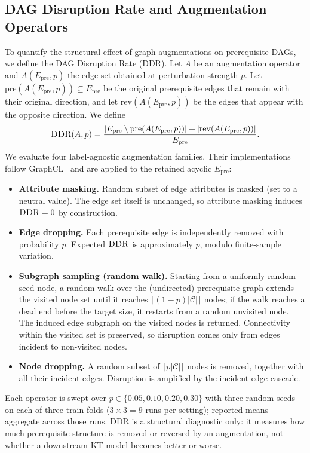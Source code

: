 \documentclass[runningheads]{llncs}
\newcommand{\Epre}{\ensuremath{E_{\text{pre}}}}
\newcommand{\DDR}{\textsc{DDR}}
\begin{document}
\subsection{DAG Disruption Rate and Augmentation Operators}
\label{sec:ddr}
To quantify the structural effect of graph augmentations on prerequisite
DAGs, we define the DAG Disruption Rate (\DDR{}). Let $A$ be an
augmentation operator and $A(\Epre,p)$ the edge set obtained at
perturbation strength $p$. Let $\mathrm{pre}(A(\Epre,p))\subseteq\Epre$
be the original prerequisite edges that remain with their original
direction, and let $\mathrm{rev}(A(\Epre,p))$ be the edges that appear
with the opposite direction. We define
\begin{equation}
\DDR(A,p)=
\frac{|\Epre\setminus \mathrm{pre}(A(\Epre,p))|
      +|\mathrm{rev}(A(\Epre,p))|}
     {|\Epre|}.
\label{eq:ddr}
\end{equation}
We evaluate four label-agnostic augmentation families. Their
implementations follow GraphCL~\cite{you2020graphcl} and are applied to
the retained acyclic $\Epre$:
\begin{itemize}
  \item \textbf{Attribute masking.} Random subset of edge attributes
  is masked (set to a neutral value). The edge set itself is
  unchanged, so attribute masking induces $\DDR=0$ by construction.
  \item \textbf{Edge dropping.} Each prerequisite edge is independently
  removed with probability $p$. Expected $\DDR$ is approximately $p$,
  modulo finite-sample variation.
  \item \textbf{Subgraph sampling (random walk).} Starting from a
  uniformly random seed node, a random walk over the (undirected)
  prerequisite graph extends the visited node set until it reaches
  $\lceil(1-p)|\mathcal{C}|\rceil$ nodes; if the walk reaches a dead
  end before the target size, it restarts from a random unvisited
  node. The induced edge subgraph on the visited nodes is returned.
  Connectivity within the visited set is preserved, so disruption
  comes only from edges incident to non-visited nodes.
  \item \textbf{Node dropping.} A random subset of $\lceil p|\mathcal{C}|\rceil$
  nodes is removed, together with all their incident edges. Disruption
  is amplified by the incident-edge cascade.
\end{itemize}
Each operator is swept over $p\in\{0.05,0.10,0.20,0.30\}$ with three
random seeds on each of three train folds ($3\times 3=9$ runs per
setting); reported means aggregate across those runs. \DDR{} is a structural diagnostic only: it measures how
much prerequisite structure is removed or reversed by an augmentation,
not whether a downstream KT model becomes better or worse.
\end{document}
